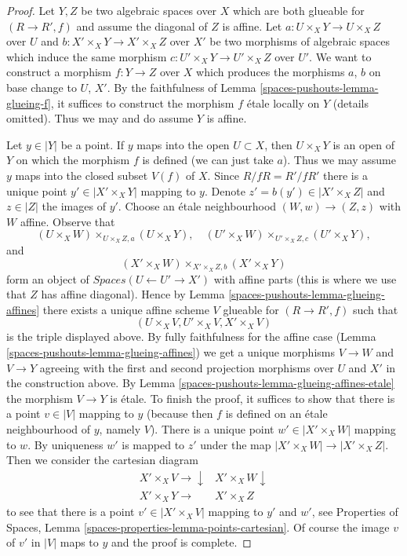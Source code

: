 \begin{proof}
Let $Y, Z$ be two algebraic spaces over $X$ which are both glueable for
$(R \to R', f)$ and assume the diagonal of $Z$ is affine. Let
$a : U \times_X Y \to U \times_X Z$ over $U$ and
$b : X' \times_X Y \to X' \times_X Z$ over $X'$ be two morphisms
of algebraic spaces
which induce the same morphism $c : U' \times_X Y \to U' \times_X Z$
over $U'$.
We want to construct a morphism $f : Y \to Z$ over $X$
which produces the morphisms $a$, $b$ on base change to $U$, $X'$.
By the faithfulness of Lemma \ref{spaces-pushouts-lemma-glueing-f}, it suffices to construct
the morphism $f$ \'etale locally on $Y$ (details omitted).
Thus we may and do assume $Y$ is affine.

\medskip\noindent
Let $y \in |Y|$ be a point. If $y$ maps into the open $U \subset X$,
then $U \times_X Y$ is an open of $Y$ on which the morphism $f$
is defined (we can just take $a$).
Thus we may assume $y$ maps into the closed subset
$V(f)$ of $X$. Since $R/fR = R'/fR'$ there is a unique point
$y' \in |X' \times_X Y|$ mapping to $y$. Denote
$z' = b(y') \in |X' \times_X Z|$ and $z \in |Z|$ the images of $y'$.
Choose an \'etale neighbourhood $(W, w) \to (Z, z)$
with $W$ affine. Observe that
$$
(U \times_X W) \times_{U \times_X Z, a} (U \times_X Y),\quad
(U' \times_X W) \times_{U' \times_X Z, c} (U' \times_X Y),
$$
and
$$
(X' \times_X W) \times_{X' \times_X Z, b} (X' \times_X Y)
$$
form an object of $\textit{Spaces}(U \leftarrow U' \to X')$
with affine parts (this is where we use that $Z$ has affine diagonal).
Hence by Lemma \ref{spaces-pushouts-lemma-glueing-affines}
there exists a unique affine scheme $V$ glueable for $(R \to R', f)$ such that
$$
(U \times_X V, U' \times_X V, X' \times_X V)
$$
is the triple displayed above. By fully faithfulness for the affine
case (Lemma \ref{spaces-pushouts-lemma-glueing-affines}) we get a unique morphisms
$V \to W$ and $V \to Y$ agreeing with the first and second projection
morphisms over $U$ and $X'$ in the construction above.
By Lemma \ref{spaces-pushouts-lemma-glueing-affines-etale} the morphism $V \to Y$ is \'etale.
To finish the proof, it suffices to show that there is a point $v \in |V|$
mapping to $y$ (because then $f$ is defined on an \'etale neighbourhood
of $y$, namely $V$).
There is a unique point $w' \in |X' \times_X W|$ mapping to $w$.
By uniqueness $w'$ is mapped to $z'$ under the map
$|X' \times_X W| \to |X' \times_X Z|$. Then we consider the cartesian
diagram
$$
\begin{array}{cc}X' \times_X V \longrightarrow\downarrow & X' \times_X W \downarrow \\ X' \times_X Y \longrightarrow & X' \times_X Z\end{array}
$$
to see that there is a point $v' \in |X' \times_X V|$
mapping to $y'$ and $w'$, see
Properties of Spaces, Lemma \ref{spaces-properties-lemma-points-cartesian}.
Of course the image $v$ of $v'$ in $|V|$ maps to $y$ and the proof is complete.
\end{proof}

